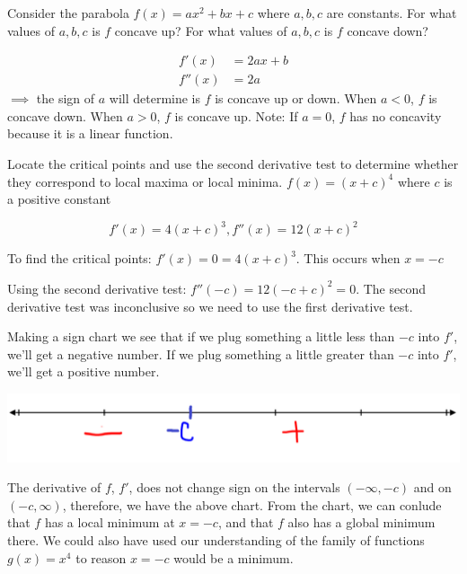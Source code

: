 \documentclass[nooutcomes,handout]{ximera}
\begin{document}
\begin{problem}
Consider the parabola $f(x)=ax^2+bx+c$ where $a,b,c$ are constants.  For what values of $a,b,c$ is $f$ concave up?  For what values of $a,b,c$ is $f$ concave down?				
\begin{freeResponse}
\begin{align*}
f'(x)&=2ax+b\\
f''(x)&=2a
\end{align*}
$\implies$ the sign of $a$ will determine is $f$ is concave up or down.  When $a<0$, $f$ is concave down.  When $a>0$, $f$ is concave up.  Note: If $a=0$, $f$ has no concavity because it is a linear function.


				
\end{freeResponse}
				
\end{problem}	


\begin{problem}
Locate the critical points and use the second derivative test to determine whether they correspond to local maxima or local minima.
$f(x)=(x+c)^4$ where $c$ is a positive constant 

\begin{freeResponse}

$$f'(x)=4(x+c)^3, f''(x)=12(x+c)^2$$

To find the critical points: $f'(x)=0=4(x+c)^3$.  This occurs when $x=-c$
 
Using the second derivative test: $f''(-c)=12(-c+c)^2=0$.  The second derivative test was inconclusive so we need to use the first derivative test.

Making a sign chart we see that if we plug something a little less than $-c$ into $f'$, we'll get a negative number.  If we plug something a little greater than $-c$ into $f'$, we'll get a positive number. 

      \begin{image}
        \includegraphics[scale = 0.3]{figure4.png}
             \end{image}
The derivative of $f$, $f'$, does not change sign on the intervals $(-\infty,-c)$ and on $(-c,\infty)$, therefore, we have the above chart.  From the chart, we can conlude that $f$ has a local minimum at $x=-c$, and that $f$ also has a global minimum there.  We could also have used our understanding of the family of functions $g(x)=x^4$ to reason $x=-c$ would be a minimum.

\end{freeResponse}
\end{problem}
\end{document}
